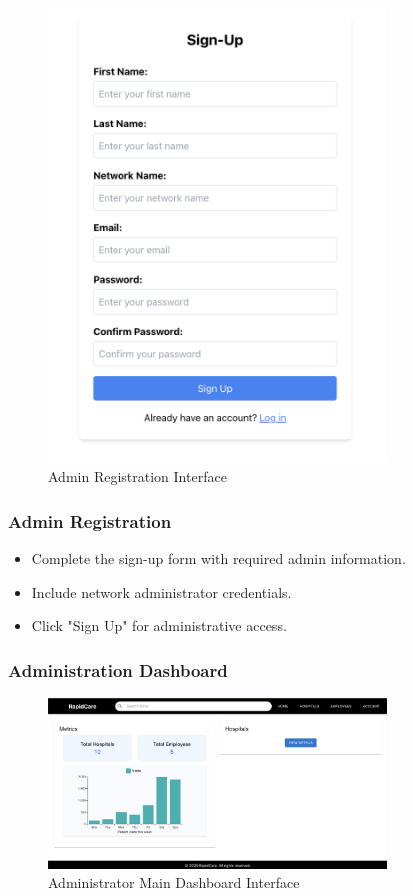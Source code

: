 \documentclass[12pt, titlepage]{article}
\begin{document}
\begin{figure}[H]
\centering
\includegraphics[width=0.8\textwidth]{signup.png}
\caption{Admin Registration Interface}
\label{fig:Registration}
\end{figure}


\subsubsection{Admin Registration}
\begin{itemize}
\item Complete the sign-up form with required admin information.
\item Include network administrator credentials.
\item Click "Sign Up" for administrative access.
\end{itemize}

\subsubsection{Administration Dashboard}
\begin{figure}[H]
\centering
\includegraphics[width=0.8\textwidth]{admin.png}
\caption{Administrator Main Dashboard Interface}
\label{fig:admin_dashboard}
\end{figure}
\end{document}
